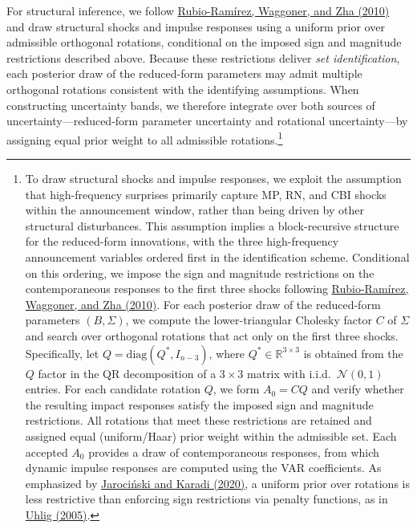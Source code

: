 \documentclass[\latexroot/\projectname]{subfiles}
\begin{document}
For structural inference, we follow \hyperlink{Rubio-Ramirez et al. (2010)}{Rubio-Ramírez, Waggoner, and Zha (2010)} and draw structural shocks and impulse responses using a uniform prior over admissible orthogonal rotations, conditional on the imposed sign and magnitude restrictions described above. Because these restrictions deliver \emph{set identification}, each posterior draw of the reduced-form parameters may admit multiple orthogonal rotations consistent with the identifying assumptions. When constructing uncertainty bands, we therefore integrate over both sources of uncertainty—reduced-form parameter uncertainty and rotational uncertainty—by assigning equal prior weight to all admissible rotations.\footnote{To draw structural shocks and impulse responses, we exploit the assumption that high-frequency surprises primarily capture MP, RN, and CBI shocks within the announcement window, rather than being driven by other structural disturbances. This assumption implies a block-recursive structure for the reduced-form innovations, with the three high-frequency announcement variables ordered first in the identification scheme. Conditional on this ordering, we impose the sign and magnitude restrictions on the contemporaneous responses to the first three shocks following \hyperlink{Rubio-Ramirez et al. (2010)}{Rubio-Ramírez, Waggoner, and Zha (2010)}. For each posterior draw of the reduced-form parameters $(B,\Sigma)$, we compute the lower-triangular Cholesky factor $C$ of $\Sigma$ and search over orthogonal rotations that act only on the first three shocks. Specifically, let $Q=\mathrm{diag}(Q^{\ast}, I_{n-3})$, where $Q^{\ast}\in\mathbb{R}^{3\times3}$ is obtained from the $Q$ factor in the QR decomposition of a $3\times3$ matrix with i.i.d.\ $\mathcal{N}(0,1)$ entries. For each candidate rotation $Q$, we form $A_0 = C Q$ and verify whether the resulting impact responses satisfy the imposed sign and magnitude restrictions. All rotations that meet these restrictions are retained and assigned equal (uniform/Haar) prior weight within the admissible set. Each accepted $A_0$ provides a draw of contemporaneous responses, from which dynamic impulse responses are computed using the VAR coefficients. As emphasized by \hyperlink{Jarociński and Karadi (2020)}{Jarociński and Karadi (2020)}, a uniform prior over rotations is less restrictive than enforcing sign restrictions via penalty functions, as in \hyperlink{Uhlig (2005)}{Uhlig (2005)}.}
\end{document}
